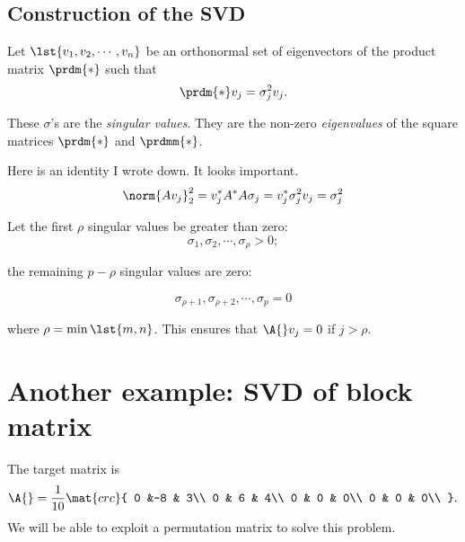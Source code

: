 
\subsection{Construction of the SVD}

Let $ \lst{v_1, v_2, \cdots, v_n} $ be an orthonormal set of eigenvectors of the product matrix $\prdm{*}$ such that
\begin{equation}
  \prdm{*} v_j  =  \sigma_j^2 v_j.
\end{equation}

These $ \sigma $'s are the {\it singular values}. They are the non-zero {\it eigenvalues} of the square matrices $ \prdm{*} $ and $ \prdmm{*} $.

Here is an identity I wrote down. It looks important.
\begin{equation}
  \norm{ A v_j }_2^2 = v_j^* A^* A \sigma_j = v_j^* \sigma_j^2 v_j = \sigma_j^2
\end{equation}

Let the first $\rho$ singular values be greater than zero:
$$
\sigma_1, \sigma_2, \cdots, \sigma_\rho > 0;
$$

the remaining $p-\rho$ singular values are zero:

$$
\sigma_{\rho+1}, \sigma_{\rho+2}, \cdots, \sigma_p = 0
$$

where $\rho = \min \lst{m, n} $. This ensures that $ \A{} v_j = 0 $ if $ j > \rho $.

%
%
%
\section{Another example: SVD of block matrix}

The target matrix is
\begin{equation}
  \A{} = \frac{1}{10}\mat{crc}
  {
  0 &-8 & 3\\
  0 & 6 & 4\\
  0 & 0 & 0\\
  0 & 0 & 0\\
  }.
\end{equation}
We will be able to exploit a permutation matrix to solve this problem.

